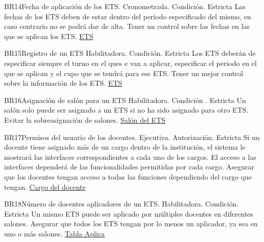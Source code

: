 \begin{BussinesRule}{BR14}{Fecha de aplicación de los ETS.} 
    \BRitem[Tipo:] Cronometrada. 
    \BRitem[Clase:] Condición.
    \BRitem[Nivel:] Estricta
    \BRitem[Descripción:] Las fechas de los ETS deben de estar dentro del periodo especificado del mismo, en caso contrario no se podrá dar de alta. 
    \BRitem[Motivación:] Tener un control sobre las fechas en las que se aplican los ETS. 
     \hyperlink{ETS}{ETS} 
    \end{BussinesRule}

\begin{BussinesRule}{BR15}{Registro de un ETS} 
    \BRitem[Tipo:] Habilitadora. 
    \BRitem[Clase:] Condición.
    \BRitem[Nivel:] Estricta
    \BRitem[Descripción:] Los ETS deberán de especificar siempre el turno en el ques e van a aplicar, especificar el periodo en el que se aplican y el cupo que se tendrá para ese ETS.
    \BRitem[Motivación:] Tener un mejor control sobre la información de los ETS.
     \hyperlink{ETS}{ETS} 
    \end{BussinesRule}

\begin{BussinesRule}{BR16}{Asignación de salón para un ETS} 
    \BRitem[Tipo:] Habilitadora. 
    \BRitem[Clase:] Condición	.
    \BRitem[Nivel:] Estricta
    \BRitem[Descripción:] Un salón solo puede ser asignado a un ETS si no ha sido asignado para otro ETS.
    \BRitem[Motivación:] Evitar la sobreasignación de salones.
     \hyperlink{SalonETS}{Salón del ETS} 
    \end{BussinesRule}

\begin{BussinesRule}{BR17}{Permisos del usuario de los docentes.} 
    \BRitem[Tipo:] Ejecutiva.
    \BRitem[Clase:] Autorización.
    \BRitem[Nivel:] Estricta
    \BRitem[Descripción:] Si un docente tiene asignado más de un cargo dentro de la institución, el sistema le mostrará las interfaces correspondientes a cada uno de los cargos. El acceso a las interfaces dependerá de las funcionalidades permitidas por cada cargo.
    \BRitem[Motivación:] Asegurar que los docentes tengan acceso a todas las funciones dependiendo del cargo que tengan.
     \hyperlink{CargoDocente}{Cargo del docente} 
    \end{BussinesRule}

\begin{BussinesRule}{BR18}{Número de docentes aplicadores de un ETS.} 
    \BRitem[Tipo:] Habilitadora. 
    \BRitem[Clase:] Condición.
    \BRitem[Nivel:] Estricta
    \BRitem[Descripción:] Un mismo ETS puede ser aplicado por múltiples docentes en diferentes salones.
    \BRitem[Motivación:] Asegurar que todos los ETS tengan por lo menos un aplicador, ya sea en uno o más salones.
     \hyperlink{Aplica}{Tabla Aplica} 
    \end{BussinesRule}

